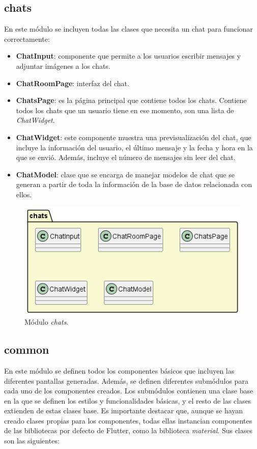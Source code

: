 \documentclass[a4paper, 12pt]{article}
\begin{document}
\subsection*{chats}

En este módulo se incluyen todas las clases que necesita un chat para funcionar correctamente:
\begin{itemize}[noitemsep]
	\item \textbf{ChatInput}: componente que permite a los usuarios escribir mensajes y adjuntar imágenes a los chats.
	\item \textbf{ChatRoomPage}: interfaz del chat.
	\item \textbf{ChatsPage}:  es la página principal que contiene todos los chats. Contiene todos los chats que un usuario tiene en ese momento, son una lista de \textit{ChatWidget}.
	\item \textbf{ChatWidget}: este componente muestra una previsualización del chat, que incluye la información del usuario, el último mensaje y la fecha y hora en la que se envió. Además, incluye el número de mensajes sin leer del chat.
	\item \textbf{ChatModel}: clase que se encarga de manejar modelos de chat que se generan a partir de toda la información de la base de datos relacionada con ellos.
\end{itemize}

\begin{figure}[H]
	\begin{center}
		{\includegraphics[width=0.7\linewidth]{diagram/Chats.png}\par}
		\caption{Módulo \textit{chats}.}
	\end{center}
\end{figure}


\subsection*{common}

En este módulo se definen todos los componentes básicos que incluyen las diferentes pantallas generadas. Además, se definen diferentes submódulos para cada uno de los componentes creados. Los submódulos contienen una clase base en la que se definen los estilos y funcionalidades básicas, y el resto de las clases extienden de estas clases base. Es importante destacar que, aunque se hayan creado clases propias para los componentes, todas ellas instancian componentes de las bibliotecas por defecto de Flutter, como la biblioteca \textit{material}. Sus clases son las siguientes:
\end{document}
